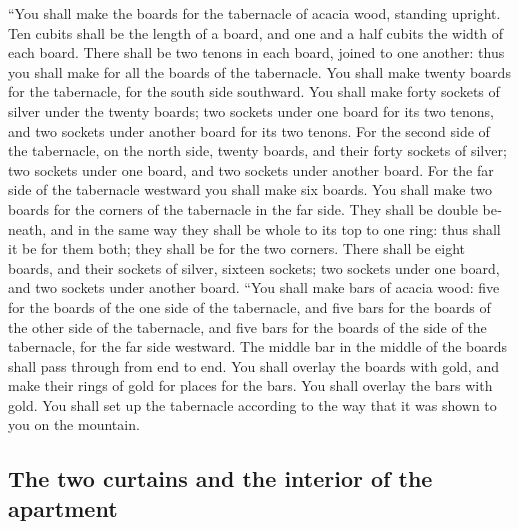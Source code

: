 \begin{paracol}{2}
\begin{otherlanguage}{english}
 ``You shall make the boards for the tabernacle of acacia
wood, standing upright.  Ten cubits shall be the length
of a board, and one and a half cubits the width of each board.
 There shall be two tenons in each board, joined to one
another: thus you shall make for all the boards of the tabernacle.
 You shall make twenty boards for the tabernacle, for the
south side southward.  You shall make forty sockets of
silver under the twenty boards; two sockets under one board for its two
tenons, and two sockets under another board for its two tenons.
 For the second side of the tabernacle, on the north
side, twenty boards,  and their forty sockets of silver;
two sockets under one board, and two sockets under another board.
 For the far side of the tabernacle westward you shall
make six boards.  You shall make two boards for the
corners of the tabernacle in the far side.  They shall be
double beneath, and in the same way they shall be whole to its top to
one ring: thus shall it be for them both; they shall be for the two
corners.  There shall be eight boards, and their sockets
of silver, sixteen sockets; two sockets under one board, and two sockets
under another board.  ``You shall make bars of acacia
wood: five for the boards of the one side of the tabernacle,
 and five bars for the boards of the other side of the
tabernacle, and five bars for the boards of the side of the tabernacle,
for the far side westward.  The middle bar in the middle
of the boards shall pass through from end to end.  You
shall overlay the boards with gold, and make their rings of gold for
places for the bars. You shall overlay the bars with gold.
 You shall set up the tabernacle according to the way
that it was shown to you on the mountain.

\hypertarget{the-two-curtains-and-the-interior-of-the-apartment}{%
\subsection{The two curtains and the interior of the
apartment}\label{the-two-curtains-and-the-interior-of-the-apartment}}


\end{otherlanguage}
\end{paracol}
